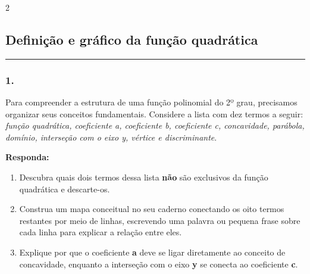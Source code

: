 \raggedcolumns
\begin{multicols*}{2}
\vspace{0.1cm}

\subsection*{Definição e gráfico da função quadrática}
\vspace{-0.2cm}\noindent\rule{\linewidth}{1.5pt} 
\par\vspace{\espacoPosTitulo}
\subsubsection*{1.} Para compreender a estrutura de uma função polinomial do 2º grau, precisamos organizar seus conceitos fundamentais. Considere a lista com dez termos a seguir: \textit{função quadrática, coeficiente a, coeficiente b, coeficiente c, concavidade, parábola, domínio, interseção com o eixo y, vértice e discriminante}. 

\begin{boxresponda}
\textbf{Responda:} 
\begin{enumerate}[label=\alph*), itemsep=\espacoAlt]
\item Descubra quais dois termos dessa lista \textbf{não} são exclusivos da função quadrática e descarte-os.
\item Construa um mapa conceitual no seu caderno conectando os oito termos restantes por meio de linhas, escrevendo uma palavra ou pequena frase sobre cada linha para explicar a relação entre eles.
\item Explique por que o coeficiente \textbf{a} deve se ligar diretamente ao conceito de concavidade, enquanto a interseção com o eixo \textbf{y} se conecta ao coeficiente \textbf{c}.
\end{enumerate}
\end{boxresponda}


\end{multicols*}
